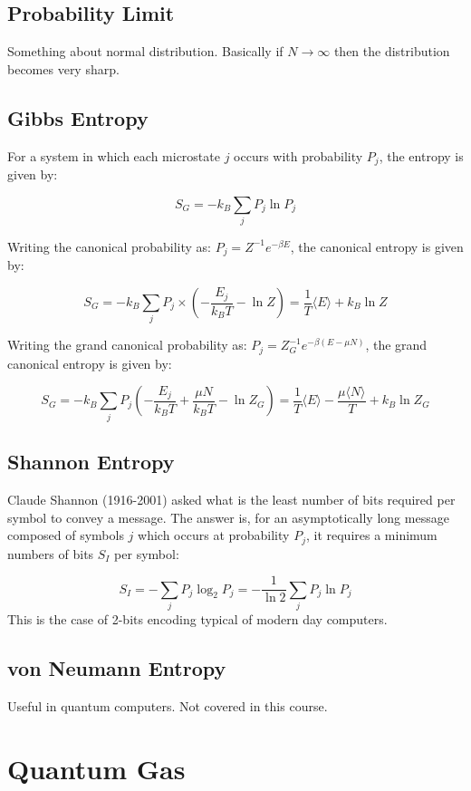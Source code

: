 \documentclass[12pt]{article}
\begin{document}
\subsection{Probability Limit}
Something about normal distribution. Basically if $N\to \infty$ then the distribution becomes very sharp.

\subsection{Gibbs Entropy}

For a system in which each microstate $j$ occurs with probability $P_j$, the entropy is given by:

\[ \boxed{S_G = -k_B\sum_jP_j \ln{P_j}}\]

Writing the canonical probability as: $P_j = Z^{-1}e^{-\beta E}$, the canonical entropy is given by:

\[\boxed{S_G = -k_B\sum_jP_j\times \left(-\frac{E_j}{k_BT} - \ln Z\right) = \frac{1}{T}\langle E \rangle + k_B \ln Z}\]

Writing the grand canonical probability as: $P_j = Z_G^{-1}e^{-\beta(E - \mu N)}$, the grand canonical entropy is given by:

\[\boxed{S_G = -k_B\sum_j P_j \left( -\frac{E_j}{k_BT} + \frac{\mu N}{k_B T} - \ln Z_G\right) = \frac1T\langle E \rangle - \frac{\mu \langle N \rangle}{T} + k_B \ln Z_G}\]

\subsection{Shannon Entropy}

Claude Shannon (1916-2001) asked what is the least number of bits required per symbol to convey a message. The answer is, for an asymptotically long message composed of symbols $j$ which occurs at probability $P_j$, it requires a minimum numbers of bits $S_I$ per symbol:

\[\boxed{S_I = -\sum_j P_j \log_2 P_j= -\frac{1}{\ln 2}\sum_j P_j \ln P_j}\]
This is the case of 2-bits encoding typical of modern day computers.

\subsection{von Neumann Entropy}
Useful in quantum computers. Not covered in this course.


\section{Quantum Gas}
\end{document}
